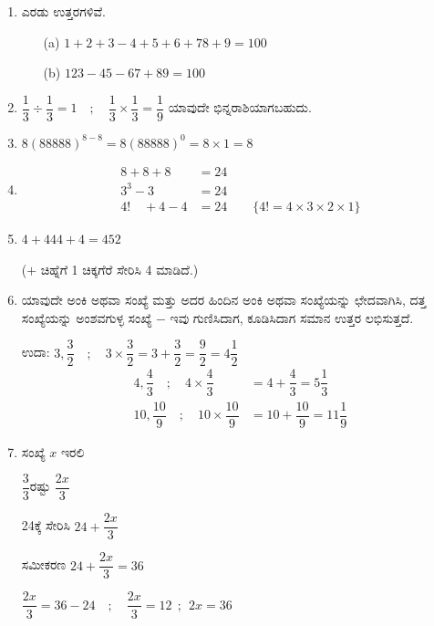 \begin{enumerate}
\itemsep=5pt

\item ಎರಡು ಉತ್ತರಗಳಿವೆ. 
\begin{itemize}
\item[(a)] $1 + 2 + 3 - 4 + 5 + 6 +78 + 9 = 100$
\item[(b)] $123 - 45 - 67 + 89 = 100$
\end{itemize}

\item $\dfrac{1}{3} \div \dfrac{1}{3} = 1\quad;\quad \dfrac{1}{3} \times \dfrac{1}{3} = \dfrac{1}{9}$ ಯಾವುದೇ ಭಿನ್ನರಾಶಿಯಾಗಬಹುದು. 

\item $8(88888)^{8-8} = 8(88888)^{0} = 8\times 1 = 8$

\item 
\begin{align*}
8 + 8 + 8 & = 24\\
3^{3} - 3 & = 24\\
4!\quad +4 - 4 & = 24 \qquad\{4! = 4 \times 3 \times 2 \times 1\}
\end{align*}

\item  $4 + 444 + 4 = 452$

($+$ ಚಿಹ್ನೆಗೆ 1 ಚಿಕ್ಕಗೆರೆ ಸೇರಿಸಿ 4 ಮಾಡಿದೆ.)

\item ಯಾವುದೇ ಅಂಕಿ ಅಥವಾ ಸಂಖ್ಯೆ ಮತ್ತು ಅದರ ಹಿಂದಿನ ಅಂಕಿ ಅಥವಾ ಸಂಖ್ಯೆಯನ್ನು ಛೇದವಾಗಿಸಿ, ದತ್ತ ಸಂಖ್ಯೆಯನ್ನು ಅಂಶವಗುಳ್ಳ ಸಂಖ್ಯೆ $-$ ಇವು ಗುಣಿಸಿದಾಗ, ಕೂಡಿಸಿದಾಗ ಸಮಾನ ಉತ್ತರ ಲಭಿಸುತ್ತದೆ. 

ಉದಾ: $3, \dfrac{3}{2} \quad;\quad 3 \times \dfrac{3}{2} = 3 + \dfrac{3}{2} = \dfrac{9}{2} = 4\dfrac{1}{2}$
\begin{align*}
4, \dfrac{4}{3} \quad;\quad 4\times \dfrac{4}{3} & = 4 + \dfrac{4}{3} = 5\dfrac{1}{3}\\
10, \dfrac{10}{9} \quad;\quad 10\times \dfrac{10}{9} & = 10 + \dfrac{10}{9} = 11\dfrac{1}{9}
\end{align*}

\item ಸಂಖ್ಯೆ $x$ ಇರಲಿ 

\vskip 0.1cm
$\dfrac{3}{3}$ರಷ್ಟು $\dfrac{2x}{3}$

\vskip 0.1cm
24ಕ್ಕೆ ಸೇರಿಸಿ $24 + \dfrac{2x}{3}$

\vskip 0.1cm
ಸಮೀಕರಣ $24 + \dfrac{2x}{3} = 36$

\vskip 0.1cm
$\dfrac{2x}{3} = 36 - 24 \quad;\quad \dfrac{2x}{3} =12 ~~;~~ 2x = 36$


\end{enumerate}
